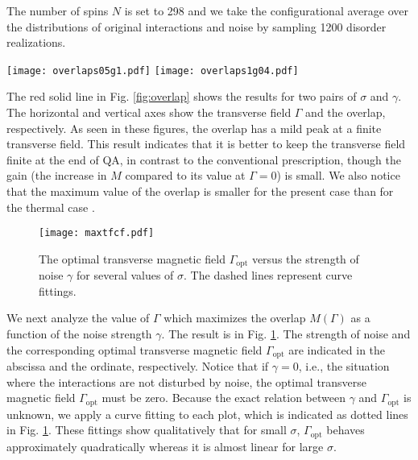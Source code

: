 \documentclass[aps,pra,twocolumn,groupedaddress,longbibliography]{revtex4}
\begin{document}
The number of spins $N$ is set to 298 and we take the configurational average over the distributions of original interactions and noise by sampling 1200 disorder realizations.

\begin{figure*}
	\centering

	\texttt{[image: overlaps05g1.pdf]}
	\texttt{[image: overlaps1g04.pdf]}

	\caption{The overlap as a function of the transverse field $\Gamma$ (red solid line) and the temperature $T$ (blue dashed line, see \cite{Nishimura2016} for details) for (a) $\sigma=0.5, \gamma=1.0$ and (b) $\sigma=1.0, \gamma=0.4$. Standard deviations are indicated in the same color.}
	\label{fig:overlap}
\end{figure*}

The red solid line in Fig. \ref{fig:overlap} shows the results for two pairs of $\sigma$ and $\gamma$. The horizontal and vertical axes show the transverse field $\Gamma$ and the overlap, respectively. As seen in these figures, the overlap has a mild peak at a finite transverse field. This result indicates that it is better to keep the transverse field finite at the end of QA, in contrast to the conventional prescription, though the gain (the increase in $M$ compared to its value at $\Gamma=0$) is small. We also notice that the maximum value of the overlap is smaller for the present case than for the thermal case \cite{Nishimura2016}.

\begin{figure}
	\centering
	\texttt{[image: maxtfcf.pdf]}
	\caption{The optimal transverse magnetic field $\Gamma_{\mathrm{opt}}$ versus the strength of noise $\gamma$ for several values of $\sigma$. The dashed lines represent curve fittings.}
	\label{fig:maxtf}
\end{figure}

We next analyze the value of $\Gamma$ which maximizes the overlap $M(\Gamma)$ as a function of the noise strength $\gamma$. The result is in Fig. \ref{fig:maxtf}. The strength of noise and the corresponding optimal transverse magnetic field $\Gamma_{\mathrm{opt}}$ are indicated in the abscissa and the ordinate, respectively. Notice that if $\gamma = 0$, i.e., the situation where the interactions are not disturbed by noise, the optimal transverse magnetic field $\Gamma_{\mathrm{opt}}$ must be zero. Because the exact relation between $\gamma$ and $\Gamma_{\mathrm{opt}}$ is unknown, we apply a curve fitting to each plot, which is indicated as dotted lines in Fig. \ref{fig:maxtf}. These fittings show qualitatively that for small $\sigma$, $\Gamma_{\mathrm{opt}}$ behaves approximately quadratically whereas it is almost linear for large $\sigma$. 
\end{document}
